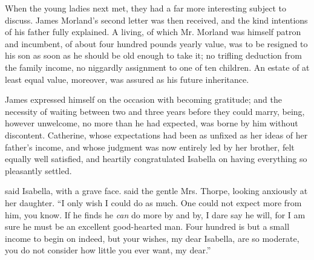 
When the young ladies next met, they had a far more interesting subject to discuss. James Morland's second letter was then received, and the kind intentions of his father fully explained. A living, of which Mr. Morland was himself patron and incumbent, of about four hundred pounds yearly value, was to be resigned to his son as soon as he should be old enough to take it; no trifling deduction from the family income, no niggardly assignment to one of ten children. An estate of at least equal value, moreover, was assured as his future inheritance.

James expressed himself on the occasion with becoming gratitude; and the necessity of waiting between two and three years before they could marry, being, however unwelcome, no more than he had expected, was borne by him without discontent. Catherine, whose expectations had been as unfixed as her ideas of her father's income, and whose judgment was now entirely led by her brother, felt equally well satisfied, and heartily congratulated Isabella on having everything so pleasantly settled.

 said Isabella, with a grave face.  said the gentle Mrs. Thorpe, looking anxiously at her daughter. “I only wish I could do as much. One could not expect more from him, you know. If he finds he {\em can} do more by and by, I dare say he will, for I am sure he must be an excellent good-hearted man. Four hundred is but a small income to begin on indeed, but your wishes, my dear Isabella, are so moderate, you do not consider how little you ever want, my dear.”



